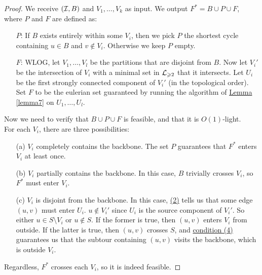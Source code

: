 \documentclass[./main.tex]{subfiles}
\begin{document}
		\begin{proof}
			We receive $(\mathcal{I},B)$ and $V_1,\ldots,V_k$ as input. We output $F^*=B\cup P\cup F$, where $P$ and $F$ are defined as:

			\begin{enumerate}
				\item[$P$:] If $B$ exists entirely within some $V_i$, then we pick $P$ the shortest cycle containing $u\in B$ and $v\notin V_i$. Otherwise we keep $P$ empty.

				\item[$F$:] WLOG, let $V_1,\ldots,V_l$ be the partitions that are disjoint from $B$. Now let $V_i'$ be the intersection of $V_i$ with a minimal set in $\mathcal{L}_{\geqslant 2}$ that it intersects. Let $U_i$ be the first strongly connected component of $V_i'$ (in the topological order). Set $F$ to be the eulerian set guaranteed by running the algorithm of \hyperref[lemma7]{Lemma \ref{lemma7}} on $U_1,\ldots,U_l$.
			\end{enumerate}\vspace{2mm}

			Now we need to verify that $B\cup P\cup F$ is feasible, and that it is $O(1)$-light.\\

			For each $V_i$, there are three possibilities:
			\begin{enumerate}
				\item[(a)] $V_i$ completely contains the backbone. The set $P$ guarantees that $F^*$ enters $V_i$ at least once.

				\item[(b)] $V_i$ partially contains the backbone. In this case, $B$ trivially crosses $V_i$, so $F^*$ must enter $V_i$.

				\item[(c)] $V_i$ is disjoint from the backbone. In this case, \hyperref[lemm:main:2]{(2)} tells us that some edge $(u,v)$ must enter $U_i$. $u\notin V_i'$ since $U_i$ is the source component of $V_i'$. So either $u\in S\setminus V_i$ or $u\notin S$. If the former is true, then $(u,v)$ enters $V_i$ from outside. If the latter is true, then $(u,v)$ crosses $S$, and \hyperref[lemm:main:4]{condition (4)} guarantees us that the subtour containing $(u,v)$ visits the backbone, which is outside $V_i$.
			\end{enumerate}

			Regardless, $F^*$ crosses each $V_i$, so it is indeed feasible.\vspace{2mm}


\end{proof}
\end{document}
